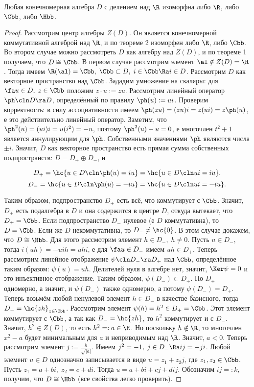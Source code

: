 \documentclass[a4paper]{article}
\begin{document}
\begin{theorem}[Фробениуса]
Любая конечномерная алгебра $D$ с делением над $\R$ изоморфна либо $\R$, либо $\Cbb$, либо $\Hbb$.
\end{theorem}
\begin{proof}
Рассмотрим центр алгебры $Z(D)$. Он является конечномерной коммутативной алгеброй над $\R$, и по теореме 2
изоморфен либо $\R$, либо $\Cbb$. Во втором случае можно рассмотреть $D$ как алгебру над $Z(D)$, и по теореме
1 получаем, что $D \cong \Cbb$. В первом случае рассмотрим элемент $\al \notin Z(D)=\R$. Тогда имеем
$\R(\al) = \Cbb, \; \Cbb \subset D, \; i \in \Cbb \Ra i \in D$. Рассмотрим $D$ как векторное пространство
над $\Cbb$. Зададим умножение на скаляры: для $\fa u \in D, \; z \in \Cbb$ положим $z \cdot u := zu$.
Рассмотрим линейный оператор $\ph\cln D \ra D$, определённый по правилу $\ph(u):=ui$. Проверим корректность: в
силу ассоциативности имеем $\ph(zu)=(zu)i=z(ui)=z\ph(u)$, е это действительно линейный оператор. Заметим,
что $\ph^2(u)=(ui)i=u(i^2)=-u$, поэтому $\ph^2(u)+u=0$, е многочлен $t^2+1$ является аннулирующим для
$\ph$. Собственными значениями $\ph$ являются числа $\pm i$. Значит, $D$ как векторное пространство есть
прямая сумма собственных подпространств: $D = D_+ \oplus D_-$, и

$$D_+ = \hc{u \in D\cln \ph(u)=iu}=\hc{u \in D\cln ui=iu},$$
$$D_- = \hc{u \in D\cln \ph(u)=-iu}=\hc{u \in D\cln ui=-iu}.$$

Таким образом, подпространство $D_+$ есть всё, что коммутирует с $\Cbb$. Значит, $D_+$ есть подалгебра в  $D$
и она содержится в центре $D$, откуда вытекает, что $D_+ = \Cbb$. Если подпространство $D_-$ нулевое (е $D$
коммутативна), то $D=\Cbb$. Если же $D$ некоммутативна, то $D_- \neq \hc{0}$. В этом случае докажем, что $D
\cong \Hbb$. Для этого рассмотрим элемент $h \in D_-, \; h \neq 0$. Пусть $u \in D_-$, тогда
$i(uh)=-uih=uhi$, е для $\fa u \in D_-$ имеем $uh \in D_+$. Теперь рассмотрим линейное отображение
$\psi\cln D_- \ra D_+$ над $\Cbb$, определённое таким образом: $\psi(u)=uh$. Делителей нуля в алгебре нет, значит,
$\Ker \psi = 0$ и это инъективное отображение. Таким образом, $\psi(D_-) \subset D_+$. Но $D_+$ одномерно, а
значит, и $\psi(D_-)$ также одномерно, а потому $\psi(D_-)=D_+$. Теперь возьмём любой ненулевой элемент $h
\in D_-$ в качестве базисного, тогда $D_- = \hc{zh}_{z \in \Cbb}$. Рассмотрим элемент $\psi(h) = h^2 \in D_+
= \Cbb$. Этот элемент коммутирует с $\Cbb$, а так как $D_-=\hc{zh}$, то $h^2$ коммутирует и с $D_-$. Значит,
$h^2 \in Z(D)$, то есть $h^2=:a \in \R$. Но поскольку $h \notin \R$, то многочлен $x^2-a$ будет минимальным
для $a$ и неприводимым над $\R$. Значит, $a < 0$. Теперь рассмотрим элемент $j:=\frac{h}{\sqrt{|a|}}$. Имеем
$j^2=-1, \; j \in D_- \Ra ij=-ji$. Любой элемент $u \in D$ однозначно записывается в виде $u=z_1 + z_2 j$,
где $z_1, z_2 \in \Cbb$. Пусть $z_1=a+bi, \; z_2=c+di$. Тогда $u=a+bi+cj+dij$. Обозначим $ij=:k$, получим,
что $D \cong \Hbb$ (все свойства легко проверить).
\end{proof}
\end{document}
